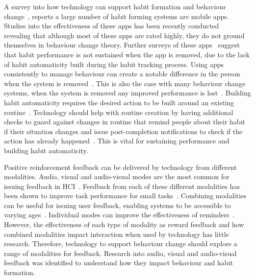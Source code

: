 \documentclass{scaffold/sigchi}
\begin{document}
A survey into how technology can support habit formation and behaviour change~\cite{survey_on_current_apps_of_steel}, reports a large number of habit forming systems are mobile apps. Studies into the effectiveness of these apps has been recently conducted~\cite{article_beyond_self_tracking_designing_apps, article_dont_kick_habit} revealing that although most of these apps are rated highly, they do not ground themselves in behaviour change theory. Further surveys of these apps~\cite{survey_on_apps_2} suggest that habit performance is not sustained when the app is removed, due to the lack of habit automaticity built during the habit tracking process. Using apps consistently to manage behaviour can create a notable difference in the person when the system is removed~\cite{article_my_phone_is_part_of_my_soul}.
This is also the case with many behaviour change systems, when the system is removed any improved performance is lost~\cite{article_dont_kick_habit, article_realtime_feedback_improving_medication_taking}. Building habit automaticity requires the desired action to be built around an existing routine~\cite{article_how_habits_formed_modelling_habit_formation, article_implementation_intentions_multicue}. Technology should help with routine creation by having additional checks to guard against changes in routine that remind people about their habit if their situation changes and issue post-completion notifications to check if the action has already happened~\cite{article_dont_forget_your_pill}. This is vital for sustaining performance and building habit automaticity.

Positive reinforcement feedback can be delivered by technology from different modalities. Audio, visual and audio-visual modes are the most common for issuing feedback in HCI~\cite{desinging_interface_speech_tech}. Feedback from each of these different modalities has been shown to improve task performance for small tasks~\cite{chi_oussama_tap_the_shapetones}. Combining modalities can be useful for issuing user feedback, enabling systems to be accessible to varying ages~\cite{article_user_centred_multimodal_reminders}. Individual modes can improve the effectiveness of reminders~\cite{multi_modal_reminders_less_disruptive, article_designing_multimodal_reminders_for_home}. However, the effectiveness of each type of modality as reward feedback and how combined modalities impact interaction when used by technology has little research. Therefore, technology to support behaviour change should explore a range of modalities for feedback. Research into audio, visual and audio-visual feedback was identified to understand how they impact behaviour and habit formation.
\end{document}
